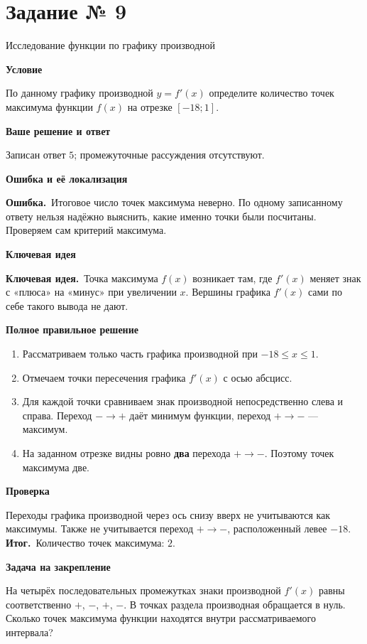 \documentclass[a4paper,12pt]{article}
\newcommand{\keyidea}{\textcolor{accent}{\textbf{Ключевая идея.}}\ }
\newcommand{\wrong}{\textcolor{errorcolor}{\textbf{Ошибка.}}\ }
\newcommand{\result}{\textcolor{accent}{\textbf{Итог.}}\ }
\newcommand{\taskstart}[2]{\clearpage\phantomsection\label{task:#1}\section*{Задание № #1}\textcolor{accent}{#2}\par\vspace{2mm}}
\newcommand{\field}[1]{\par\smallskip\textbf{#1}\par\vspace{-3mm}}
\begin{document}
\taskstart{9}{Исследование функции по графику производной}
\field{Условие}
По данному графику производной $y=f'(x)$ определите количество точек максимума функции $f(x)$ на отрезке $[-18;1]$.
\field{Ваше решение и ответ}
Записан ответ $5$; промежуточные рассуждения отсутствуют.
\field{Ошибка и её локализация}
\wrong Итоговое число точек максимума неверно. По одному записанному ответу нельзя надёжно выяснить, какие именно точки были посчитаны. Проверяем сам критерий максимума.
\field{Ключевая идея}
\keyidea Точка максимума $f(x)$ возникает там, где $f'(x)$ меняет знак с «плюса» на «минус» при увеличении $x$. Вершины графика $f'(x)$ сами по себе такого вывода не дают.
\field{Полное правильное решение}
\begin{enumerate}
\item Рассматриваем только часть графика производной при $-18\le x\le1$.
\item Отмечаем точки пересечения графика $f'(x)$ с осью абсцисс.
\item Для каждой точки сравниваем знак производной непосредственно слева и справа. Переход $-\to+$ даёт минимум функции, переход $+\to-$ --- максимум.
\item На заданном отрезке видны ровно \textbf{два} перехода $+\to-$. Поэтому точек максимума две.
\end{enumerate}
\field{Проверка}
Переходы графика производной через ось снизу вверх не учитываются как максимумы. Также не учитывается переход $+\to-$, расположенный левее $-18$.
\result Количество точек максимума: $\boxed{2}$.
\field{Задача на закрепление}
На четырёх последовательных промежутках знаки производной $f'(x)$ равны соответственно $+$, $-$, $+$, $-$. В точках раздела производная обращается в нуль. Сколько точек максимума функции находятся внутри рассматриваемого интервала?
\end{document}
